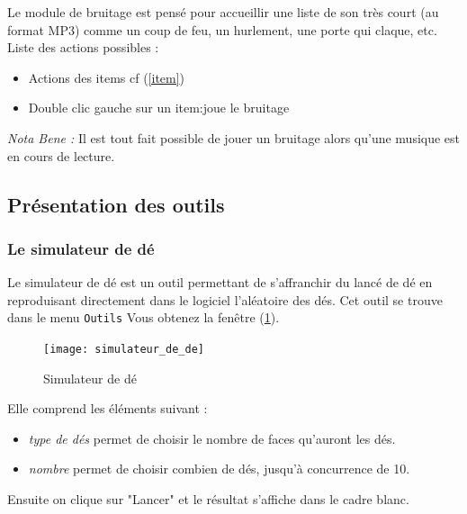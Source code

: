 \documentclass[a4paper,12pt]{article}
\newcommand*{\interfaceitem}[1]{\texttt{#1}}
\begin{document}
Le module de bruitage est pensé pour accueillir une liste de son très court (au format MP3) comme un coup de feu, un hurlement, une porte qui claque, etc.
\\
Liste des actions possibles :
\begin{itemize}
    \item Actions des items cf (\ref{item})
    \item Double clic gauche sur un item:joue le bruitage
\end{itemize}

\emph{Nota Bene :} Il est tout fait possible de jouer un bruitage alors qu'une musique est en cours de lecture.

\subsection{Présentation des outils}
\label{sec:outils}

\subsubsection{Le simulateur de dé}
Le simulateur de dé est un outil permettant de s'affranchir du lancé de dé en reproduisant directement dans le logiciel l'aléatoire des dés.
Cet outil se trouve dans le menu \interfaceitem{Outils}
Vous obtenez la fenêtre (\ref{simulateur_de}).
\begin{figure}[h]
    \texttt{[image: simulateur\_de\_de]}
    \caption{Simulateur de dé}
    \label{simulateur_de}
\end{figure}

Elle comprend les éléments suivant :
\begin{itemize}
  \item  \emph{type de dés} permet de choisir le nombre de faces qu'auront les dés.
  \item \emph{nombre} permet de choisir combien de dés, jusqu'à concurrence de 10.
\end{itemize}
Ensuite on clique sur "Lancer" et le résultat s'affiche dans le cadre blanc.
\end{document}
